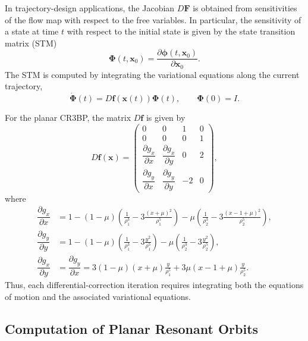 In trajectory-design applications, the Jacobian $D\boldsymbol{F}$ is obtained from sensitivities of the flow map with respect to the free variables. 
In particular, the sensitivity of a state at time $t$ with respect to the initial state is given by the state transition matrix (STM)
\[
    \boldsymbol{\Phi}(t,\boldsymbol{x}_0)
    =
    \frac{\partial \boldsymbol{\phi}(t,\boldsymbol{x}_0)}
    {\partial \boldsymbol{x}_0}.
\]
The STM is computed by integrating the variational equations along the current trajectory,
\begin{equation} \label{eq: STM}
    \dot{\boldsymbol{\Phi}}(t)
    =
    D\boldsymbol{f}(\boldsymbol{x}(t))\boldsymbol{\Phi}(t),
    \qquad
    \boldsymbol{\Phi}(0)=I.
\end{equation}

For the planar CR3BP, the matrix $D\boldsymbol{f}$ is given by 
\begin{equation}
    D\boldsymbol{f}(\boldsymbol{x})
    =
    \begin{pmatrix}
    0 & 0 & 1 & 0 \\
    0 & 0 & 0 & 1 \\
    \dfrac{\partial g_x}{\partial x} & \dfrac{\partial g_x}{\partial y} & 0 & 2 \\
    \dfrac{\partial g_y}{\partial x} & \dfrac{\partial g_y}{\partial y} & -2 & 0
    \end{pmatrix},
\end{equation}
where
\begin{align}
    \dfrac{\partial g_x}{\partial x} 
    &= 1 - (1 - \mu) \left( \frac{1}{\rho_1^3} - 3 \frac{(x + \mu)^2}{\rho_1^5} \right)
         - \mu \left( \frac{1}{\rho_2^3} - 3 \frac{(x - 1 + \mu)^2}{\rho_2^5} \right), \\
    \dfrac{\partial g_y}{\partial y} 
    &= 1 - (1 - \mu) \left( \frac{1}{\rho_1^3} - 3 \frac{y^2}{\rho_1^5} \right)
         - \mu \left( \frac{1}{\rho_2^3} - 3 \frac{y^2}{\rho_2^5} \right), \\
    \dfrac{\partial g_x}{\partial y} 
    &= \dfrac{\partial g_y}{\partial x} 
    = 3(1-\mu)(x+\mu)\frac{y}{\rho_1^5}
      + 3\mu(x-1+\mu)\frac{y}{\rho_2^5}.
\end{align}
Thus, each differential-correction iteration requires integrating both the equations of motion and the associated variational equations.





\subsection{Computation of Planar Resonant Orbits} \label{subsec: computationOfPlanarResonantOrbits}

